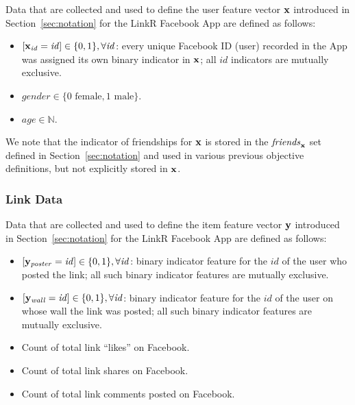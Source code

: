 Data that are collected and used to define the user feature vector
$\mathbf{x}$ introduced in Section~\ref{sec:notation} for the LinkR Facebook
App are defined as follows:
\begin{itemize}
\item $[\mathbf{x}_\mathit{id} = \mathit{id}] \in \{ 0, 1 \}, \forall \mathit{id}$: 
every unique Facebook ID (user) recorded in the App was assigned its own
binary indicator in $\mathbf{x}$; all $\mathit{id}$ indicators are mutually exclusive.
\item $\mathit{gender} \in \{ 0 \mbox{ female}, 1 \mbox{ male} \}$.
\item $\mathit{age} \in \mathbb{N}$.
\end{itemize}
We note that the indicator of friendships for $\mathbf{x}$ is stored in the
$\mathit{friends}_{\mathbf{x}}$ set defined in Section~\ref{sec:notation} and
used in various previous objective definitions, but not explicitly 
stored in $\mathbf{x}$.

\subsubsection{Link Data}

Data that are collected and used to define the item feature vector
$\mathbf{y}$ introduced in Section~\ref{sec:notation} for the LinkR Facebook
App are defined as follows:
\begin{itemize}
\item $[\mathbf{y}_\mathit{poster} = \mathit{id}] \in \{ 0, 1 \}, \forall \mathit{id}$:  
binary indicator feature for the $\mathit{id}$ of the user who posted the link;
all such binary indicator features are mutually exclusive.
\item $[\mathbf{y}_\mathit{wall} = \mathit{id}] \in \{ 0, 1 \}, \forall \mathit{id}$:
binary indicator feature for the $\mathit{id}$ of the user on whose wall the link was posted; all such binary indicator features are mutually exclusive.
\item Count of total link ``likes'' on Facebook.
\item Count of total link shares on Facebook.
\item Count of total link comments posted on Facebook.
\end{itemize}

